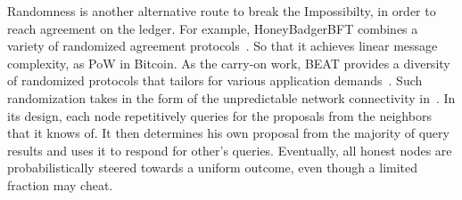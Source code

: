 Randomness is another alternative route to break the Impossibilty, in order to reach agreement on the ledger. 
For example, HoneyBadgerBFT combines a variety of randomized agreement protocols~\cite{miller2016honey}. 
So that it achieves linear message complexity, as PoW in Bitcoin. 
As the carry-on work, BEAT provides a diversity of randomized protocols that tailors for various application demands~\cite{duan2018beat}. 
Such randomization takes in the form of the unpredictable network connectivity in~\cite{rocket2019scalable}.
In its design, each node repetitively queries for the proposals from the neighbors that it knows of. 
It then determines his own proposal from the majority of query results and uses it to respond for other's queries. 
Eventually, all honest nodes are probabilistically steered towards a uniform outcome, even though a limited fraction may cheat. 


